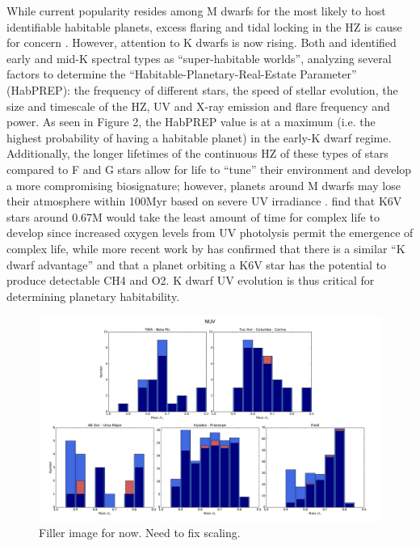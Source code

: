 \documentclass[twocolumn]{aastex62}
\begin{document}
While current popularity resides among M dwarfs for the most likely to host identifiable habitable planets, excess flaring and tidal locking in the HZ is cause for concern \citep[e.g.][]{Shields2016}. However, attention to K dwarfs is now rising. Both \citet{Heller2014} and \citet{Cuntz2016} identified early and mid-K spectral types as “super-habitable worlds”, analyzing several factors to determine the “Habitable-Planetary-Real-Estate Parameter” (HabPREP): the frequency of different stars, the speed of stellar evolution, the size and timescale of the HZ, UV and X-ray emission and flare frequency and power. As seen in Figure 2, the HabPREP value is at a maximum (i.e. the highest probability of having a habitable planet) in the early-K dwarf regime. Additionally, the longer lifetimes of the continuous HZ of these types of stars compared to F and G stars allow for life to “tune” their environment and develop a more compromising biosignature; however, planets around M dwarfs may lose their atmosphere within 100Myr based on severe UV irradiance \citep{Airapetian2017}. \citet{Lingam2017} find that K6V stars around 0.67M  would take the least amount of time for complex life to develop since increased oxygen levels from UV photolysis permit the emergence of complex life, while more recent work by \citet{Arney2017}
has confirmed that there is a similar “K dwarf advantage” and that a planet orbiting a K6V star has the potential to produce detectable CH4 and O2. K dwarf UV evolution is thus critical for determining planetary habitability.

\begin{figure}[h]
\centering
\includegraphics[width=.9\linewidth]{massdistributions_nuv.pdf}
\caption{Filler image for now. Need to fix scaling. \label{fig:massdistributions_nuv}}
\end{figure}
\end{document}
